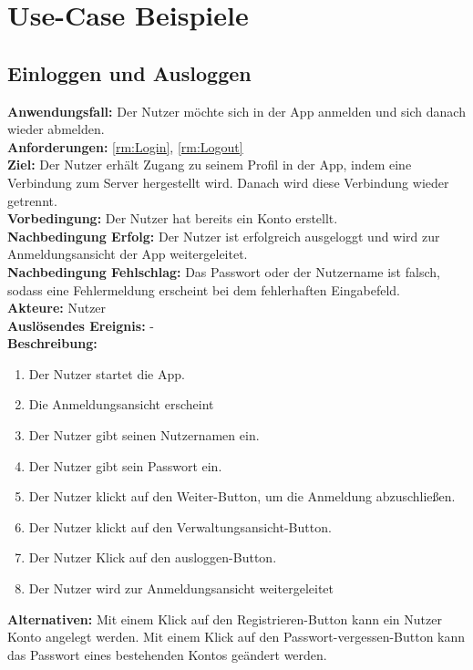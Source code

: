 \documentclass[parskip=full]{scrartcl}
\newcommand{\changelocaltocdepth}[1]{%
  \addtocontents{toc}{\protect\setcounter{tocdepth}{#1}}%
  \setcounter{tocdepth}{#1}%
}
\newcommand{\enablesubsectionnumbering}[1]{
    \renewcommand{\thesubsection}{$\langle$#1\arabic{subsection}0$\rangle$}
    \changelocaltocdepth{1} 
}
\begin{document}
\section{Use-Case Beispiele}

\enablesubsectionnumbering{F}
\subsection{Einloggen und Ausloggen}
\textbf{Anwendungsfall:} Der Nutzer möchte sich in der App anmelden und sich danach wieder abmelden.\\
\textbf{Anforderungen:} \ref{rm:Login}, \ref{rm:Logout}\\
\textbf{Ziel:} Der Nutzer erhält Zugang zu seinem Profil in der App, indem eine Verbindung zum Server hergestellt wird. Danach wird diese Verbindung wieder getrennt.\\
\textbf{Vorbedingung:} Der Nutzer hat bereits ein Konto erstellt.\\
\textbf{Nachbedingung Erfolg:} Der Nutzer ist erfolgreich ausgeloggt und wird zur Anmeldungsansicht der App weitergeleitet.\\
\textbf{Nachbedingung Fehlschlag:} Das Passwort oder der Nutzername ist falsch, sodass eine Fehlermeldung erscheint bei dem fehlerhaften Eingabefeld.\\
\textbf{Akteure:} Nutzer\\
\textbf{Auslösendes Ereignis:} -\\
\textbf{Beschreibung:}
\begin{enumerate}
    \item Der Nutzer startet die App.
    \item Die Anmeldungsansicht erscheint
    \item Der Nutzer gibt seinen Nutzernamen ein.
    \item Der Nutzer gibt sein Passwort ein.
    \item Der Nutzer klickt auf den Weiter-Button, um die Anmeldung abzuschließen.
    \item Der Nutzer klickt auf den Verwaltungsansicht-Button.
    \item Der Nutzer Klick auf den ausloggen-Button.
    \item Der Nutzer wird zur Anmeldungsansicht weitergeleitet
\end{enumerate}
\textbf{Alternativen:} Mit einem Klick auf den Registrieren-Button kann ein Nutzer Konto angelegt werden. Mit einem Klick auf den Passwort-vergessen-Button kann das Passwort eines bestehenden Kontos geändert werden.
\newpage
\end{document}
